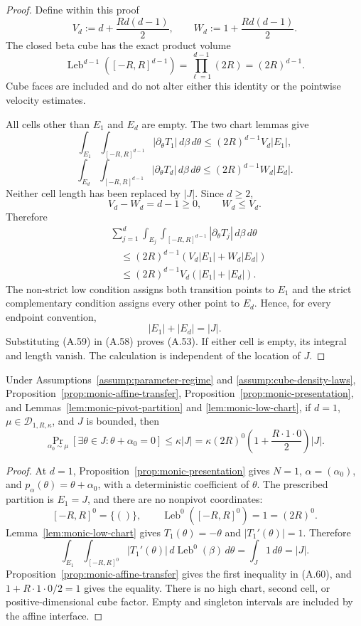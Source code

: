 \begin{proof}
Define within this proof
\[
V_d:=d+\frac{Rd(d-1)}2,
\qquad
W_d:=1+\frac{Rd(d-1)}2.
\]
The closed beta cube has the exact product volume
\[
\operatorname{Leb}^{d-1}([-R,R]^{d-1})
=\prod_{\ell=1}^{d-1}(2R)=(2R)^{d-1}.
\tag{A.54}
\]
Cube faces are included and do not alter either this identity or the
pointwise velocity estimates.

All cells other than $E_1$ and $E_d$ are empty.  The two chart lemmas give
\[
\int_{E_1}\int_{[-R,R]^{d-1}}
|\partial_\theta T_1|\,d\beta\,d\theta
\leq(2R)^{d-1}V_d|E_1|,
\tag{A.55}
\]
\[
\int_{E_d}\int_{[-R,R]^{d-1}}
|\partial_\theta T_d|\,d\beta\,d\theta
\leq(2R)^{d-1}W_d|E_d|.
\tag{A.56}
\]
Neither cell length has been replaced by $|J|$.  Since $d\geq2$,
\[
V_d-W_d=d-1\geq0,
\qquad W_d\leq V_d.
\tag{A.57}
\]
Therefore
\[
\begin{aligned}
&\sum_{j=1}^d\int_{E_j}\int_{[-R,R]^{d-1}}
|\partial_\theta T_j|\,d\beta\,d\theta\\
&\quad\leq(2R)^{d-1}
 (V_d|E_1|+W_d|E_d|)\\
&\quad\leq(2R)^{d-1}V_d(|E_1|+|E_d|).
\end{aligned}
\tag{A.58}
\]
The non-strict low condition assigns both transition points to $E_1$ and the
strict complementary condition assigns every other point to $E_d$.  Hence,
for every endpoint convention,
\[
|E_1|+|E_d|=|J|.
\tag{A.59}
\]
Substituting (A.59) in (A.58) proves (A.53).  If either cell is empty, its
integral and length vanish.  The calculation is independent of the location
of $J$.
\end{proof}

\begin{proposition}
\label{prop:monic-linear-branch}
Under Assumptions~\ref{assump:parameter-regime} and
\ref{assump:cube-density-laws}, Proposition~\ref{prop:monic-affine-transfer},
Proposition~\ref{prop:monic-presentation}, and
Lemmas~\ref{lem:monic-pivot-partition} and
\ref{lem:monic-low-chart}, if $d=1$,
$\mu\in\mathcal D_{1,R,\kappa}$, and $J$ is bounded, then
\[
\Pr_{\alpha_0\sim\mu}
[\exists\theta\in J:\theta+\alpha_0=0]
\leq\kappa|J|
=\kappa(2R)^0
 \left(1+\frac{R\cdot1\cdot0}{2}\right)|J|.
\tag{A.60}
\]
\end{proposition}

\begin{proof}
At $d=1$, Proposition~\ref{prop:monic-presentation} gives $N=1$,
$\alpha=(\alpha_0)$, and $p_\alpha(\theta)=\theta+\alpha_0$, with a
deterministic coefficient of $\theta$.  The prescribed partition is
$E_1=J$, and there are no nonpivot coordinates:
\[
[-R,R]^0=\{()\},
\qquad
\operatorname{Leb}^0([-R,R]^0)=1=(2R)^0.
\]
Lemma~\ref{lem:monic-low-chart} gives
$T_1(\theta)=-\theta$ and $|T_1'(\theta)|=1$.  Therefore
\[
\int_{E_1}\int_{[-R,R]^0}|T_1'(\theta)|
\,d\operatorname{Leb}^0(\beta)\,d\theta
=\int_J1\,d\theta=|J|.
\tag{A.61}
\]
Proposition~\ref{prop:monic-affine-transfer} gives the first inequality in
(A.60), and $1+R\cdot1\cdot0/2=1$ gives the equality.  There is no high
chart, second cell, or positive-dimensional cube factor.  Empty and
singleton intervals are included by the affine interface.
\end{proof}

